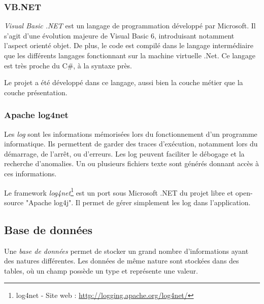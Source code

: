 
\subsubsection{VB.NET}

\textit{Visual Basic .NET} est un langage de programmation développé par Microsoft.
Il s'agit d'une évolution majeure de Visual Basic 6, introduisant notamment l'aspect orienté objet.
De plus, le code est compilé dans le langage intermédiaire que les différents langages fonctionnant sur la machine virtuelle .Net.
Ce langage est très proche du C\#, à la syntaxe près.

Le projet a été développé dans ce langage, aussi bien la couche métier que la couche présentation.


\subsubsection{Apache log4net}


Les \textit{log} sont les informations mémorisées lors du fonctionnement d'un programme informatique.
Ils permettent de garder des traces d'exécution, notamment lors du démarrage, de l'arrêt, ou d'erreurs.
Les log peuvent faciliter le débogage et la recherche d'anomalies.
Un ou plusieurs fichiers texte sont générés donnant accès à ces informations.

Le framework \textit{log4net}\footnote{log4net - Site web : \url{http://logging.apache.org/log4net/}} est un port sous Microsoft .NET du projet libre et open-source "Apache log4j".
Il permet de gérer simplement les log dans l'application.


\subsection{Base de données}

Une \textit{base de données} permet de stocker un grand nombre d'informations ayant des natures différentes.
Les données de même nature sont stockées dans des tables, où un champ possède un type et représente une valeur.

